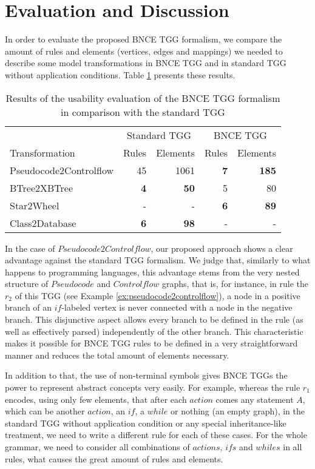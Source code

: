 \documentclass[runningheads]{llncs}
\begin{document}
\section{Evaluation and Discussion}
\label{sec:eval}
In order to evaluate the proposed BNCE TGG formalism, we compare the amount of rules and elements (vertices, edges and mappings) we needed to describe some model transformations in BNCE TGG and in standard TGG without application conditions. Table \ref{tab:formalism-eval} presents these results.
\begin{table}[h]
	\centering
	\begin{tabular}{l r r r r }
		& \multicolumn{2}{c}{Standard TGG} & \multicolumn{2}{c}{BNCE TGG}\\
		Transformation 			& Rules & Elements 	& Rules & Elements\\
		\hline
		Pseudocode2Controlflow	& 45			& 1061	& \textbf{7}	& \textbf{185} \\
		BTree2XBTree			& \textbf{4}	& \textbf{50}	& 5		& 80 \\
		Star2Wheel				& -				& -		& \textbf{6} 	& \textbf{89} \\
		Class2Database			& \textbf{6}	& \textbf{98}	& -	& -
	\end{tabular}
	\caption{Results of the usability evaluation of the BNCE TGG formalism in comparison with the standard TGG}
	\label{tab:formalism-eval}
\end{table}

In the case of $Pseudocode2Controlflow$, our proposed approach shows a clear advantage against the standard TGG formalism. We judge that, similarly to what happens to programming languages, this advantage stems from the very nested structure of $Pseudocode$ and $Controlflow$ graphs, that is, for instance, in rule the $r_2$ of this TGG (see Example \ref{ex:pseudocode2controlflow}), a node in a positive branch of an $if$-labeled vertex is never connected with a node in the negative branch. This disjunctive aspect allows every branch to be defined in the rule (as well as effectively parsed) independently of the other branch. This characteristic makes it possible for BNCE TGG rules to be defined in a very straightforward manner and reduces the total amount of elements necessary.

In addition to that, the use of non-terminal symbols gives BNCE TGGs the power to represent abstract concepts very easily. For example, whereas the rule $r_1$ encodes, using only few elements, that after each $action$ comes any statement $A$, which can be another $action$, an $if$, a $while$ or nothing (an empty graph), in the standard TGG without application condition or any special inheritance-like treatment, we need to write a different rule for each of these cases. For the whole grammar, we need to consider all combinations of $actions$, $ifs$ and $whiles$ in all rules, what causes the great amount of rules and elements.
\end{document}
